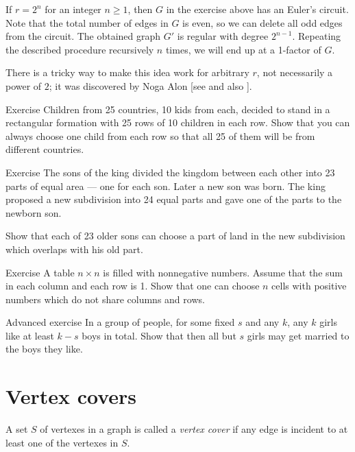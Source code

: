 If $r=2^n$ for an integer $n\ge 1$, then $G$ in the exercise above has an Euler's circuit. 
Note that the total number of edges in $G$ is even, so we can delete all odd edges from the circuit.
The obtained graph $G'$ is regular with degree $2^{n-1}$.
Repeating the described procedure recursively $n$ times, 
we will end up at a 1-factor of $G$.

There is a tricky way to make this idea work for arbitrary $r$, not necessarily a power of $2$; 
it was discovered by Noga Alon [see  and also ]. 

\begin{thm}{Exercise}
Children from 25 countries, 10 kids from each, decided to stand in a rectangular formation with 25 rows of 10 children in each row.
Show that you can always choose one child from each row so that all 25 of them will be from different countries.
\end{thm}

\begin{thm}{Exercise}
The sons of the king divided the kingdom between each other into 23 parts of equal area --- one for each son.
Later a new son was born. 
The king proposed a new subdivision into 24 equal parts and gave one of the parts to the newborn son.

Show that each of 23 older sons can choose a part of land in the new subdivision which overlaps with his old part.
\end{thm}

\begin{thm}{Exercise} A table $n{\times}n$ is filled with nonnegative numbers.
Assume that the sum in each column and each row is 1.
Show that one can choose $n$ cells with positive numbers which do not share columns and rows. 
\end{thm}


\begin{thm}{Advanced exercise}
In a group of people, for some fixed $s$ and any $k$,
any $k$ girls like at least $k-s$ boys in total.
Show that then all but $s$ girls may get married to the boys they like.
\end{thm}



\section*{Vertex covers}

A set $S$ of vertexes in a graph is called a \emph{vertex cover} if any edge is incident to at least one of the vertexes in $S$.

